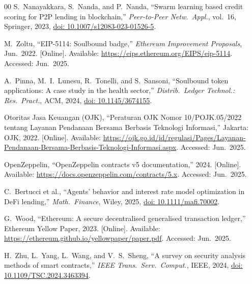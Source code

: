 \documentclass[conference]{IEEEtran}
\begin{document}
\begin{thebibliography}{00}
S.~Nanayakkara, S.~Nanda, and P.~Nanda,
``Swarm learning based credit scoring for P2P lending in blockchain,''
\textit{Peer-to-Peer Netw.\ Appl.}, vol.~16, Springer, 2023,
\href{https://doi.org/10.1007/s12083-023-01526-5}{doi: 10.1007/s12083-023-01526-5}.

M.~Zoltu,
``EIP-5114: Soulbound badge,''
\textit{Ethereum Improvement Proposals}, Jun.\ 2022. [Online]. Available:
\url{https://eips.ethereum.org/EIPS/eip-5114}.
Accessed: Jun.\ 2025.

A.~Pinna, M.~I.~Lunesu, R.~Tonelli, and S.~Sansoni,
``Soulbound token applications: A case study in the health sector,''
\textit{Distrib.\ Ledger Technol.: Res.\ Pract.}, ACM, 2024,
\href{https://doi.org/10.1145/3674155}{doi: 10.1145/3674155}.

Otoritas Jasa Keuangan (OJK),
``Peraturan OJK Nomor 10/POJK.05/2022 tentang Layanan Pendanaan Bersama
Berbasis Teknologi Informasi,''
Jakarta: OJK, 2022. [Online]. Available:
\url{https://ojk.go.id/id/regulasi/Pages/Layanan-Pendanaan-Bersama-Berbasis-Teknologi-Informasi.aspx}.
Accessed: Jun.\ 2025.

OpenZeppelin,
``OpenZeppelin contracts v5 documentation,''
2024. [Online]. Available:
\url{https://docs.openzeppelin.com/contracts/5.x}.
Accessed: Jun.\ 2025.

C.~Bertucci et al.,
``Agents' behavior and interest rate model optimization in DeFi lending,''
\textit{Math.\ Finance}, Wiley, 2025,
\href{https://doi.org/10.1111/mafi.70002}{doi: 10.1111/mafi.70002}.

G.~Wood,
``Ethereum: A secure decentralised generalised transaction ledger,''
Ethereum Yellow Paper, 2023. [Online]. Available:
\url{https://ethereum.github.io/yellowpaper/paper.pdf}.
Accessed: Jun.\ 2025.

H.~Zhu, L.~Yang, L.~Wang, and V.~S.~Sheng,
``A survey on security analysis methods of smart contracts,''
\textit{IEEE Trans.\ Serv.\ Comput.}, IEEE, 2024,
\href{https://doi.org/10.1109/TSC.2024.3463394}{doi: 10.1109/TSC.2024.3463394}.

\end{thebibliography}
\end{document}
